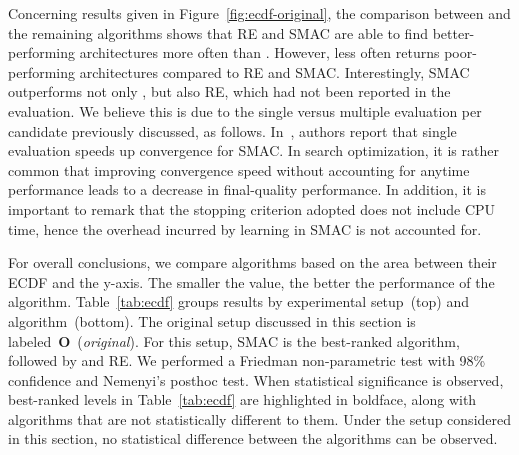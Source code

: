 Concerning results given in Figure~\ref{fig:ecdf-original}, the comparison between \irace and the remaining algorithms shows that RE and SMAC are able to find better-performing architectures more often than \irace. However, \irace less often returns poor-performing architectures compared to RE and SMAC. Interestingly, SMAC outperforms not only \irace, but also RE, which had not been reported in the \nasbench evaluation. We believe this is due to the single versus multiple evaluation per candidate previously discussed, as follows. In~\cite{YinKleChrReaMurHut2019nasbench}, authors report that single evaluation speeds up convergence for SMAC. In search optimization, it is rather common that improving convergence speed without accounting for anytime performance leads to a decrease in final-quality performance. In addition, it is important to remark that the stopping criterion adopted does not include CPU time, hence the overhead incurred by learning in SMAC is not accounted for. 

For overall conclusions, we compare algorithms based on the area between their ECDF and the y-axis. The smaller the value, the better the performance of the algorithm.
Table~\ref{tab:ecdf} groups results by experimental setup~(top) and algorithm~(bottom). The original setup discussed in this section is labeled~\textbf{O}~(\textit{original}). For this setup, SMAC is the best-ranked algorithm, followed by \irace and RE.
We performed a Friedman non-parametric test with 98\% confidence and Nemenyi's posthoc test. When statistical significance is observed, best-ranked levels in Table~\ref{tab:ecdf} are highlighted in boldface, along with algorithms that are not statistically different to them.
Under the setup considered in this section, no statistical difference between the algorithms can be observed. 

